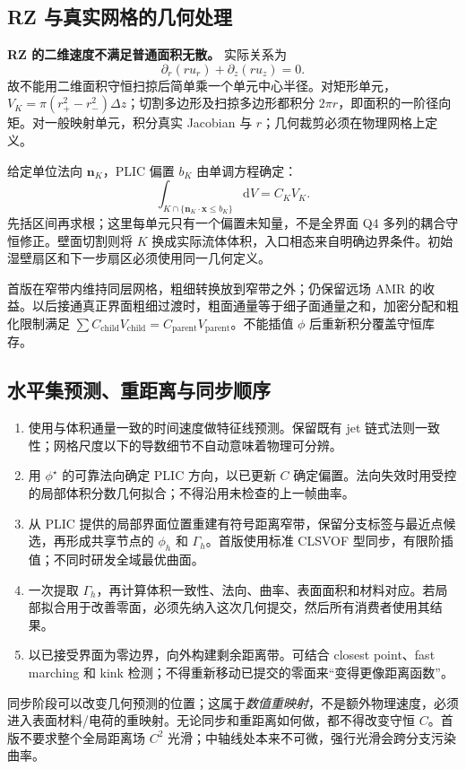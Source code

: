 \documentclass[11pt,a4paper]{article}
\newcommand{\dd}{\mathrm{d}}
\newcommand{\vct}[1]{\boldsymbol{#1}}
\begin{document}
\subsection{RZ 与真实网格的几何处理}
\textbf{RZ 的二维速度不满足普通面积无散。} 实际关系为
\begin{equation}
 \partial_r(ru_r)+\partial_z(ru_z)=0.
\end{equation}
故不能用二维面积守恒扫掠后简单乘一个单元中心半径。对矩形单元，$V_K=\pi(r_+^2-r_-^2)\Delta z$；切割多边形及扫掠多边形都积分 $2\pi r$，即面积的一阶径向矩。对一般映射单元，积分真实 Jacobian 与 $r$；几何裁剪必须在物理网格上定义。

给定单位法向 $\vct n_K$，PLIC 偏置 $b_K$ 由单调方程确定：
\begin{equation}
 \int_{K\cap\{\vct n_K\cdot\vct x\le b_K\}}\dd V=C_KV_K.
\end{equation}
先括区间再求根；这里每单元只有一个偏置未知量，不是全界面 Q4 多列的耦合守恒修正。壁面切割则将 $K$ 换成实际流体体积，入口相态来自明确边界条件。初始湿壁扇区和下一步扇区必须使用同一几何定义。

首版在窄带内维持同层网格，粗细转换放到窄带之外；仍保留远场 AMR 的收益。以后接通真正界面粗细过渡时，粗面通量等于细子面通量之和，加密分配和粗化限制满足 $\sum C_{\mathrm{child}}V_{\mathrm{child}}=C_{\mathrm{parent}}V_{\mathrm{parent}}$。不能插值 $\phi$ 后重新积分覆盖守恒库存。

\subsection{水平集预测、重距离与同步顺序}
\begin{enumerate}
\item 使用与体积通量一致的时间速度做特征线预测。保留既有 jet 链式法则一致性；网格尺度以下的导数细节不自动意味着物理可分辨。
\item 用 $\phi^\star$ 的可靠法向确定 PLIC 方向，以已更新 $C$ 确定偏置。法向失效时用受控的局部体积分数几何拟合；不得沿用未检查的上一帧曲率。
\item 从 PLIC 提供的局部界面位置重建有符号距离窄带，保留分支标签与最近点候选，再形成共享节点的 $\phi_h$ 和 $\Gamma_h$。首版使用标准 CLSVOF 型同步，有限阶插值；不同时研发全域最优曲面。
\item 一次提取 $\Gamma_h$，再计算体积一致性、法向、曲率、表面面积和材料对应。若局部拟合用于改善零面，必须先纳入这次几何提交，然后所有消费者使用其结果。
\item 以已接受界面为零边界，向外构建剩余距离带。可结合 closest point、fast marching 和 kink 检测\cite{henri2022}；不得重新移动已提交的零面来“变得更像距离函数”。
\end{enumerate}
同步阶段可以改变几何预测的位置；这属于\emph{数值重映射}，不是额外物理速度，必须进入表面材料/电荷的重映射。无论同步和重距离如何做，都不得改变守恒 $C$。首版不要求整个全局距离场 $C^2$ 光滑；中轴线处本来不可微，强行光滑会跨分支污染曲率。
\end{document}
